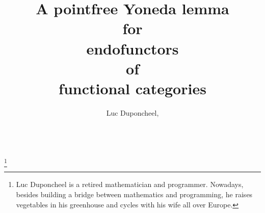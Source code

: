 \documentclass[journal]{journal}
\begin{document}
\title{
A pointfree Yoneda lemma\\
for\\
endofunctors\\
of\\
functional categories
}

\author{
Luc Duponcheel, \\ 
~
}

\thanks{
Luc Duponcheel is a retired mathematician and programmer. 
Nowadays, besides building a bridge between mathematics and programming,
he raises vegetables in his greenhouse and cycles with his wife all over Europe. 
}

\maketitle

\thispagestyle{empty}
\end{document}
